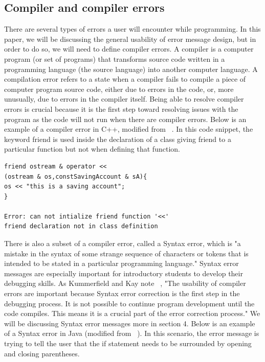 \documentclass{sig-alternate}
\begin{document}


\subsection{Compiler and compiler errors}

There are several types of errors a user will encounter while programming. In this paper, we will be discussing the general usability of error message design, but in order to do so, we will need to define compiler errors. A compiler is a computer program (or set of programs) that transforms source code written in a programming language (the source language) into another computer language.  A compilation error refers to a state when a compiler fails to compile a piece of computer program source code, either due to errors in the code, or, more unusually, due to errors in the compiler itself. Being able to resolve compiler errors is crucial because it is the first step toward resolving issues with the program as the code will not run when there are compiler errors. Below is an example of a compiler error in C++, modified from ~\cite{Traver:2010}. In this code snippet, the keyword friend is used inside the declaration of a class giving friend to a particular function but not when defining that function. 

\begin{verbatim}
friend ostream & operator << 
(ostream & os,constSavingAccount & sA){
os << "this is a saving account";
}

Error: can not intialize friend function '<<' 
friend declaration not in class definition
\end{verbatim}

There is also a subset of a compiler error, called a Syntax error, which is "a mistake in the syntax of some strange sequence of characters or tokens that is intended to be stated in a particular programming language." Syntax error messages are especially important for introductory students to develop their debugging skills. As Kummerfield and Kay note ~\cite{Kummerfeld:2003:NBF:858403.858416}, "The usability of compiler errors are important because Syntax error correction is the first step in the debugging process. It is not possible to continue program development until the code compiles. This means it is a crucial part of the error correction process." We will be discussing Syntax error messages more in section 4. Below is an example of a Syntax error in Java (modified from  ~\cite{Denny:2014:ESE:2591708.2591748}). In this scenario, the error message is trying to tell the user that the if statement needs to be surrounded by opening and closing parentheses.
\end{document}
